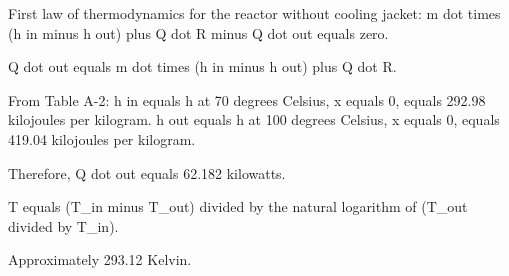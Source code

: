 First law of thermodynamics for the reactor without cooling jacket:  
m dot times (h in minus h out) plus Q dot R minus Q dot out equals zero.  

Q dot out equals m dot times (h in minus h out) plus Q dot R.  

From Table A-2:  
h in equals h at 70 degrees Celsius, x equals 0, equals 292.98 kilojoules per kilogram.  
h out equals h at 100 degrees Celsius, x equals 0, equals 419.04 kilojoules per kilogram.  

Therefore, Q dot out equals 62.182 kilowatts.

T equals (T_in minus T_out) divided by the natural logarithm of (T_out divided by T_in).  

Approximately 293.12 Kelvin.